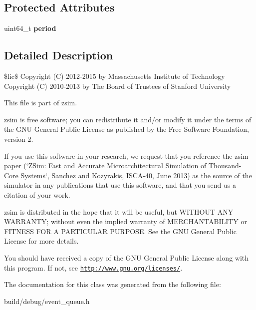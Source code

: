 \subsection*{Protected Attributes}
\begin{DoxyCompactItemize}
\item 
\hypertarget{classEvent_a48c0276ea0ab0cc4043161bff53b145d}{uint64\-\_\-t {\bfseries period}}\label{classEvent_a48c0276ea0ab0cc4043161bff53b145d}

\end{DoxyCompactItemize}


\subsection{Detailed Description}
\$lic\$ Copyright (C) 2012-\/2015 by Massachusetts Institute of Technology Copyright (C) 2010-\/2013 by The Board of Trustees of Stanford University

This file is part of zsim.

zsim is free software; you can redistribute it and/or modify it under the terms of the G\-N\-U General Public License as published by the Free Software Foundation, version 2.

If you use this software in your research, we request that you reference the zsim paper (\char`\"{}\-Z\-Sim\-: Fast and Accurate Microarchitectural Simulation of
\-Thousand-\/\-Core Systems\char`\"{}, Sanchez and Kozyrakis, I\-S\-C\-A-\/40, June 2013) as the source of the simulator in any publications that use this software, and that you send us a citation of your work.

zsim is distributed in the hope that it will be useful, but W\-I\-T\-H\-O\-U\-T A\-N\-Y W\-A\-R\-R\-A\-N\-T\-Y; without even the implied warranty of M\-E\-R\-C\-H\-A\-N\-T\-A\-B\-I\-L\-I\-T\-Y or F\-I\-T\-N\-E\-S\-S F\-O\-R A P\-A\-R\-T\-I\-C\-U\-L\-A\-R P\-U\-R\-P\-O\-S\-E. See the G\-N\-U General Public License for more details.

You should have received a copy of the G\-N\-U General Public License along with this program. If not, see \href{http://www.gnu.org/licenses/}{\tt http\-://www.\-gnu.\-org/licenses/}. 

The documentation for this class was generated from the following file\-:\begin{DoxyCompactItemize}
\item 
build/debug/event\-\_\-queue.\-h\end{DoxyCompactItemize}
